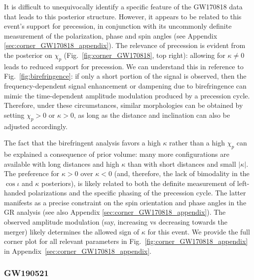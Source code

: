 \documentclass[aps,prd,twocolumn,superscriptaddress,preprintnumbers,nofootinbib]{revtex4-2}
\begin{document}
It is difficult to unequivocally identify a specific feature of the GW170818 data that leads to this posterior structure.
However, it appears to be related to this event's support for precession, in conjunction with its uncommonly definite measurement of the polarization, phase and spin angles \cite{Varma:2021csh} (see Appendix \ref{sec:corner_GW170818_appendix}).
The relevance of precession is evident from the posterior on $\chi_p$ (Fig.~\ref{fig:corner_GW170818}, top right): allowing for $\kappa \neq 0$ leads to reduced support for precession.
We can understand this in reference to Fig.~\ref{fig:birefringence}: if only a short portion of the signal is observed, then the frequency-dependent signal enhancement or dampening due to birefringence can mimic the time-dependent amplitude modulation produced by a precession cycle.
Therefore, under these circumstances, similar morphologies can be obtained by setting $\chi_p > 0$ or $\kappa > 0$, as long as the distance and inclination can also be adjusted accordingly.

The fact that the birefringent analysis favors a high $\kappa$ rather than a high $\chi_p$ can be explained a consequence of prior volume: many more configurations are available with long distances and high $\kappa$ than with short distances and small $|\kappa|$.
The preference for $\kappa > 0$ over $\kappa < 0$ (and, therefore, the lack of bimodality in the $\cos\iota$ and $\kappa$ posteriors), is likely related to both the definite measurement of left-handed polarizations and the specific phasing of the precession cycle.
The latter manifests as a precise constraint on the spin orientation and phase angles in the \ac{GR} analysis \cite{Varma:2021csh} (see also Appendix \ref{sec:corner_GW170818_appendix}).
The observed amplitude modulation (say, increasing vs decreasing towards the merger) likely determines the allowed sign of $\kappa$ for this event.
We provide the full corner plot for all relevant parameters in Fig.~\ref{fig:corner_GW170818_appendix} in Appendix~\ref{sec:corner_GW170818_appendix}.

\subsubsection{GW190521}
\label{sec:GW190521}
\end{document}
